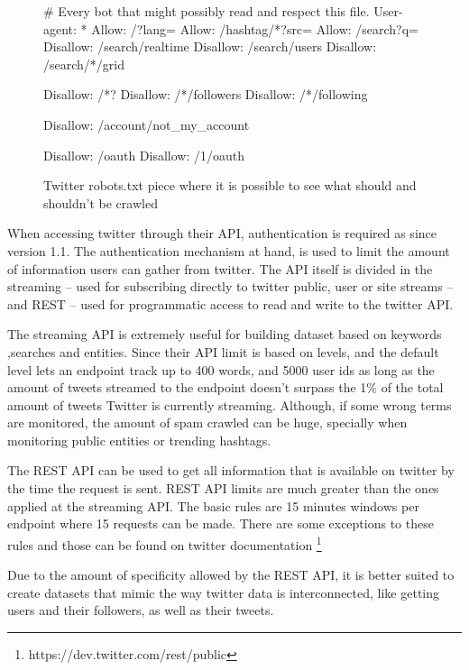\begin{figure}[htpb]
  \centering
  \begin{boxedverbatim}
  # Every bot that might possibly read and respect this file.
  User-agent: *
  Allow: /?lang=
  Allow: /hashtag/*?src=
  Allow: /search?q=%
  Disallow: /search/realtime
  Disallow: /search/users
  Disallow: /search/*/grid

  Disallow: /*?
  Disallow: /*/followers
  Disallow: /*/following

  Disallow: /account/not_my_account

  Disallow: /oauth
  Disallow: /1/oauth
  \end{boxedverbatim}
  \caption{Twitter robots.txt piece where it is possible to see what should and shouldn't be crawled}
  \label{fig:twitterrobots}
\end{figure}

When accessing twitter through their API, authentication is required as since version 1.1. The authentication mechanism at hand, is used to limit the amount of information users can gather from twitter. 
The API itself is divided in the streaming -- used for subscribing directly to twitter public, user or site streams --  and REST -- used for programmatic access to read and write to the twitter API.  

The streaming API is extremely useful for building dataset based on keywords ,searches and entities. Since their API limit is based on levels, and the default level lets an endpoint track up to 400 words, and 5000 user ids as long as the amount of tweets streamed to the endpoint doesn't  surpass the 1\% of the total amount of tweets Twitter is currently streaming. Although, if some wrong terms are monitored, the amount of spam crawled can be huge, specially when monitoring public entities or trending hashtags. 

The REST API can be used to get all information that is available on twitter by the time the request is sent. REST API limits are much greater than the ones applied at the streaming API. The basic rules are 15 minutes windows per endpoint where 15 requests can be made. There are some exceptions to these rules and those can be found on twitter documentation \footnote{https://dev.twitter.com/rest/public}

Due to the amount of specificity allowed by the REST API, it is better suited to create datasets that mimic the way twitter data is interconnected, like getting users and their followers, as well as their tweets.

